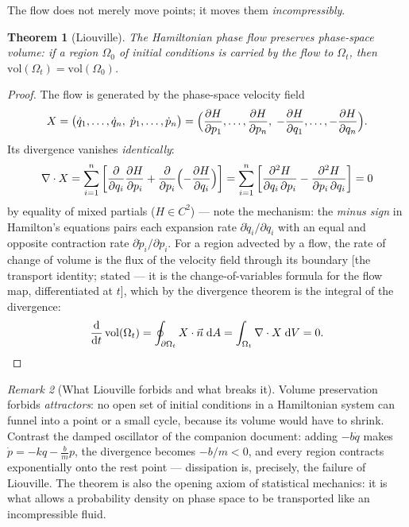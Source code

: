 \documentclass[11pt]{article}
\theoremstyle{plain}
\newtheorem{theorem}{Theorem}[section]
\theoremstyle{definition}
\theoremstyle{remark}
\newtheorem{remark}[theorem]{Remark}
\newcommand{\dd}{\mathrm{d}}
\newcommand{\pd}[2]{\frac{\partial #1}{\partial #2}}
\begin{document}
The flow does not merely move points; it moves them
\emph{incompressibly}.

\begin{theorem}[Liouville]\label{thm:liouville}
The Hamiltonian phase flow preserves phase-space volume: if a region
$\Omega_0$ of initial conditions is carried by the flow to $\Omega_t$,
then $\mathrm{vol}(\Omega_t) = \mathrm{vol}(\Omega_0)$.
\end{theorem}

\begin{proof}
The flow is generated by the phase-space velocity field
\begin{equation}
  X = \bigl(\dot q_1,\dots,\dot q_n,\;\dot p_1,\dots,\dot p_n\bigr)
    = \Bigl(\pd{H}{p_1},\dots,\pd{H}{p_n},\;
      -\pd{H}{q_1},\dots,-\pd{H}{q_n}\Bigr).
\end{equation}
Its divergence vanishes \emph{identically}:
\begin{equation}
  \nabla\cdot X
  = \sum_{i=1}^n\left[\pd{}{q_i}\pd{H}{p_i}
  + \pd{}{p_i}\Bigl(-\pd{H}{q_i}\Bigr)\right]
  = \sum_{i=1}^n\left[\frac{\partial^2 H}{\partial q_i\,\partial p_i}
  - \frac{\partial^2 H}{\partial p_i\,\partial q_i}\right]
  = 0
\end{equation}
by equality of mixed partials ($H \in C^2$) --- note the mechanism: the
\emph{minus sign} in Hamilton's equations pairs each expansion rate
$\partial\dot q_i/\partial q_i$ with an equal and opposite contraction
rate $\partial\dot p_i/\partial p_i$. For a region advected by a flow, the
rate of change of volume is the flux of the velocity field through its
boundary [the transport identity; stated --- it is the
change-of-variables formula for the flow map, differentiated at $t$],
which by the divergence theorem is the integral of the
divergence:
\begin{equation}
  \frac{\dd}{\dd t}\,\mathrm{vol}(\Omega_t)
  = \oint_{\partial\Omega_t} X\cdot\vec n\;\dd A
  = \int_{\Omega_t} \nabla\cdot X\;\dd V
  = 0 . \qedhere
\end{equation}
\end{proof}

\begin{remark}[What Liouville forbids and what breaks it]
Volume preservation forbids \emph{attractors}: no open set of initial
conditions in a Hamiltonian system can funnel into a point or a small
cycle, because its volume would have to shrink. Contrast the damped
oscillator of the companion document: adding $-b\dot q$ makes
$\dot p = -kq - \tfrac{b}{m}p$, the divergence becomes $-b/m < 0$, and
every region contracts exponentially onto the rest point --- dissipation
is, precisely, the failure of Liouville. The theorem is also the opening
axiom of statistical mechanics: it is what allows a probability density on
phase space to be transported like an incompressible fluid.
\end{remark}
\end{document}
